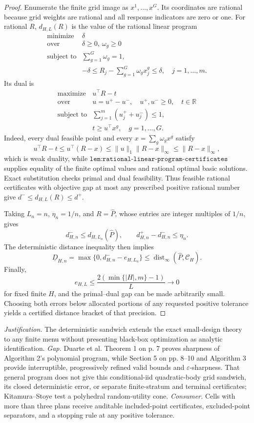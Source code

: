 \documentclass{article}
\begin{document}
\begin{proof}
Enumerate the finite grid image as \(x^1,\ldots,x^G\).  Its coordinates are rational because grid weights are rational and all response indicators are zero or one.  For rational \(R\), \(d_{H,L}(R)\) is the value of the rational linear program
\[
 \begin{array}{ll}
 \text{minimize}&\delta\\
 \text{over}&\delta\ge0,\ \omega_g\ge0\\
 \text{subject to}&\displaystyle\sum_{g=1}^G\omega_g=1,\\
 &\displaystyle-\delta\le R_j-\sum_{g=1}^G\omega_gx^g_j\le\delta,
 \quad j=1,\ldots,m.
 \end{array}
\]
Its dual is
\[
 \begin{array}{ll}
 \text{maximize}&u^\top R-t\\
 \text{over}&u=u^+-u^-,\quad u^+,u^-\ge0,\quad t\in\mathbb R\\
 \text{subject to}&\displaystyle\sum_{j=1}^m(u_j^++u_j^-)\le1,\\
 &t\ge u^\top x^g,\quad g=1,\ldots,G.
 \end{array}
\]
Indeed, every dual feasible point and every \(x=\sum_g\omega_gx^g\) satisfy
\[
 u^\top R-t\le u^\top(R-x)
 \le\|u\|_1\|R-x\|_\infty
 \le\|R-x\|_\infty,
\]
which is weak duality, while \(\texttt{lem:rational-linear-program-certificates}\) supplies equality of the finite optimal values and rational optimal basic solutions.  Exact substitution checks primal and dual feasibility.  Thus feasible rational certificates with objective gap at most any prescribed positive rational number give \(d^-\le d_{H,L}(R)\le d^+\).

Taking \(L_n=n\), \(\eta_n=1/n\), and \(R=\widehat P\), whose entries are integer multiples of \(1/n\), gives
\[
 d^-_{H,n}\le d_{H,L_n}(\widehat P),
 \qquad
 d^+_{H,n}-d^-_{H,n}\le\eta_n.
\]
The deterministic distance inequality then implies
\[
 \underline D_{H,n}
 =\max\{0,d^-_{H,n}-e_{H,L_n}\}
 \le\operatorname{dist}_\infty(\widehat P,\mathcal C_H).
\]
Finally,
\[
 e_{H,L}\le\frac{2(\min\{|H|,m\}-1)}{L}\longrightarrow0
\]
for fixed finite \(H\), and the primal--dual gap can be made arbitrarily small.  Choosing both errors below allocated portions of any requested positive tolerance yields a certified distance bracket of that precision.
\end{proof}
\par\smallskip\noindent \textit{Justification.} The deterministic sandwich extends the exact small-design theory to any finite menu without presenting black-box optimization as analytic identification. \textit{Gap.} Duarte et al. Theorem 1 on p. 7 proves sharpness of Algorithm 2's polynomial program, while Section 5 on pp. 8--10 and Algorithm 3 provide interruptible, progressively refined valid bounds and \(\varepsilon\)-sharpness. That general program does not give this conditional-iid quadratic-body grid sandwich, its closed deterministic error, or separate finite-stratum and terminal certificates; Kitamura--Stoye test a polyhedral random-utility cone. \textit{Consumer.} Cells with more than three plans receive auditable included-point certificates, excluded-point separators, and a stopping rule at any positive tolerance.
\end{document}
